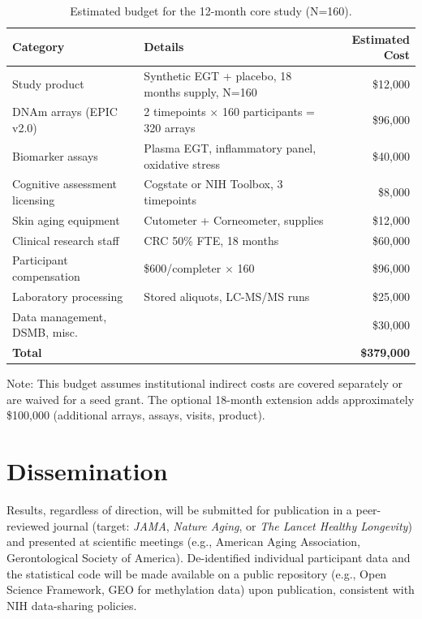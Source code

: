 \documentclass[11pt,a4paper]{article}
\begin{document}
\begin{table}[H]
\centering
\caption{Estimated budget for the 12-month core study (N=160).}
\begin{tabularx}{\textwidth}{lXr}
\toprule
\textbf{Category} & \textbf{Details} & \textbf{Estimated Cost} \\
\midrule
Study product & Synthetic EGT + placebo, 18 months supply, N=160 & \$12,000 \\
DNAm arrays (EPIC v2.0) & 2 timepoints $\times$ 160 participants = 320 arrays & \$96,000 \\
Biomarker assays & Plasma EGT, inflammatory panel, oxidative stress & \$40,000 \\
Cognitive assessment licensing & Cogstate or NIH Toolbox, 3 timepoints & \$8,000 \\
Skin aging equipment & Cutometer + Corneometer, supplies & \$12,000 \\
Clinical research staff & CRC 50\% FTE, 18 months & \$60,000 \\
Participant compensation & \$600/completer $\times$ 160 & \$96,000 \\
Laboratory processing & Stored aliquots, LC-MS/MS runs & \$25,000 \\
Data management, DSMB, misc. & & \$30,000 \\
\midrule
\textbf{Total} & & \textbf{\$379,000} \\
\bottomrule
\end{tabularx}
\end{table}

\vspace{0.5cm}
Note: This budget assumes institutional indirect costs are covered separately or are waived for a seed grant. The optional 18-month extension adds approximately \$100,000 (additional arrays, assays, visits, product).

\section{Dissemination}

Results, regardless of direction, will be submitted for publication in a peer-reviewed journal (target: \textit{JAMA}, \textit{Nature Aging}, or \textit{The Lancet Healthy Longevity}) and presented at scientific meetings (e.g., American Aging Association, Gerontological Society of America). De-identified individual participant data and the statistical code will be made available on a public repository (e.g., Open Science Framework, GEO for methylation data) upon publication, consistent with NIH data-sharing policies.
\end{document}
